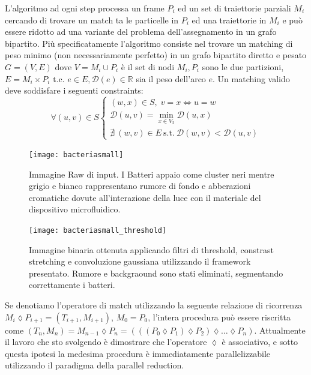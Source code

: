 \documentclass[a4paper,11pt]{paper}
\begin{document}
L'algoritmo ad ogni step processa un frame $P_i$ ed un set di traiettorie parziali $M_i$ cercando di trovare un match ta le particelle in $P_i$ ed una traiettorie in $M_i$ e può essere ridotto ad una variante del problema dell'assegnamento in un grafo bipartito.
Più specificatamente l'algoritmo consiste nel trovare un matching di peso minimo (non necessariamente perfetto) in un grafo bipartito diretto e pesato $G=(V,E)$ dove $V={M_i} \cup P_i$ è il set di nodi ${M_i}, P_i$ sono le due partizioni, $E = {M_i} \times P_i$ t.c. $e \in E, \mathcal{D}(e) \in \mathbb{R}$ sia il peso dell'arco $e$.
Un matching valido deve soddisfare i seguenti constraints: 
\begin{equation}
\forall (u,v) \in S 
\left\{
  \begin{array}{lr}
   (w,x) \in S,\; v=x\Longleftrightarrow u=w\\
   \mathcal{D}(u,v) = \min_{x \in V_2} \mathcal{D}(u,x)  \\
    \nexists \: (w,v) \in E \: \mbox{s.t.} \: \mathcal{D}(w,v) < \mathcal{D}(u,v)
  \end{array}
\right.
\label{matchConstraints}
\end{equation}
\begin{figure}
    \begin{minipage}[l]{0.5\textwidth}
        \centering
        \texttt{[image: bacteriasmall]}
       \caption{Immagine Raw di input. I Batteri appaio come cluster neri mentre grigio e bianco rappresentano rumore di fondo e abberazioni cromatiche dovute all'interazione della luce con il materiale del dispositivo microfluidico. } \label{AAA}
    \end{minipage}   
    \hfill{}
    \begin{minipage}[r]{0.5\textwidth}
        \centering
        \texttt{[image: bacteriasmall\_threshold]}
              \caption{Immagine binaria ottenuta applicando filtri di threshold, constrast stretching e convoluzione gaussiana utilizzando il framework presentato. Rumore e backgraound sono stati eliminati, segmentando correttamente i batteri.} \label{BBB}
    \end{minipage}
\end{figure}
Se denotiamo  l'operatore di match utilizzando la seguente relazione di ricorrenza $  M_i \lozenge P_{i+1} = (T_{i+1},M_{i+1}) $, $M_0=P_0$, l'intera procedura può essere riscritta come $(T_n,M_n) = M_{n-1} \lozenge P_{n}=(((P_0 \lozenge P_1)\lozenge P_2) \lozenge \ldots \lozenge P_n)$.
Attualmente il lavoro che sto svolgendo è dimostrare che l'operatore $\lozenge $ è associativo, e sotto questa ipotesi la medesima procedura è immediatamente parallelizzabile utilizzando il paradigma della parallel reduction.
\end{document}
